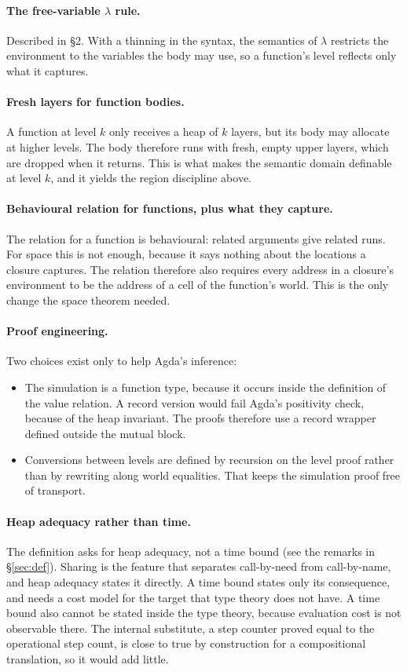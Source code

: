 \documentclass[11pt]{article}
\theoremstyle{remark}
\begin{document}
\paragraph{The free-variable $\lambda$ rule.}
Described in \S2. With a thinning in the syntax, the semantics of $\lambda$
restricts the environment to the variables the body may use, so a
function's level reflects only what it captures.

\paragraph{Fresh layers for function bodies.}
A function at level $k$ only receives a heap of $k$ layers, but its body may
allocate at higher levels. The body therefore runs with fresh, empty upper
layers, which are dropped when it returns. This is what makes the
semantic domain definable at level $k$, and it yields the region discipline
above.

\paragraph{Behavioural relation for functions, plus what they capture.}
The relation for a function is behavioural: related arguments give related
runs. For space this is not enough, because it says nothing about the
locations a closure captures. The relation therefore also requires every
address in a closure's environment to be the address of a cell of the
function's world. This is the only change the space theorem needed.

\paragraph{Proof engineering.}
Two choices exist only to help Agda's inference:
\begin{itemize}
  \item The simulation is a function type, because it occurs inside the
    definition of the value relation. A record version would fail Agda's
    positivity check, because of the heap invariant. The proofs therefore
    use a record wrapper defined outside the mutual block.
  \item Conversions between levels are defined by recursion on the
    level proof rather than by rewriting along world equalities. That keeps
    the simulation proof free of transport.
\end{itemize}

\paragraph{Heap adequacy rather than time.}
The definition asks for heap adequacy, not a time bound (see the remarks
in \S\ref{sec:def}). Sharing is the feature that separates call-by-need from
call-by-name, and heap adequacy states it directly. A time bound states only
its consequence, and needs a cost model for the target that type theory does
not have. A time bound also cannot be stated inside the type theory, because
evaluation cost is not observable there. The internal substitute, a step
counter proved equal to the operational step count, is close to true by
construction for a compositional translation, so it would add little.
\end{document}
